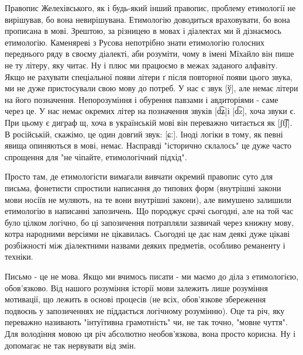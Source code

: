 Правопис Желехівського, як і будь-який інший правопис, проблему етимології не
вирішував, бо вона невирішувана. Етимологію доводиться враховувати, бо вона
прописана в мові. Зрештою, за різницею в мовах і діалектах ми й дізнаємось
етимологію. Каменяреві з Русова непотрібно знати етимологію голосних переднього
ряду в своєму діалекті, аби розуміти, чому в імені Мїхайло він пише не ту
літеру, яку читає. Ну і плюс ми працюємо в межах заданого алфавіту. Якщо не
рахувати спеціальної появи літери ґ після повторної появи цього звука, ми не
дуже пристосували свою мову до потреб. У нас є звук [ў], але немає літери на
його позначення. Непорозуміння і обурення павзами і авдиторіями - саме через
це. У нас немає окремих літер на позначення звуків [d͡ʑ]і [d͡z], хоча звуки є.
При цьому є диграф щ, хоча в українській мові він переважно читається як [ʃt͡ʃ].
В російській, скажімо, це один довгий звук: [ɕː]. Іноді логіки в тому, як певні
явища опиняються в мові, немає. Насправді "історично склалось" це дуже часто
спрощення для "не чіпайте, етимологічний підхід". 

Просто там, де етимологісти вимагали вивчати окремий правопис суто для письма,
фонетисти спростили написання до типових форм (внутрішні закони мови носіїв не
муляють, на те вони внутрішні закони), але вимушено залишили етимологію в
написанні запозичень. Що породжує срачі сьогодні, але на той час було цілком
логічно, бо ці запозичення потрапляли зазвичай через книжну мову, котра
народними версіями не цікавилась. Сьогодні це дає нам деякі дуже цікаві
розбіжності між діалектними назвами деяких предметів, особливо реманенту і
техніки.

Письмо - це не мова. Якщо ми вчимось писати - ми маємо до діла з етимологією,
обов'язково. Від нашого розуміння історії мови залежить лише розуміння
мотивації, що лежить в основі процесів (не всіх, обов'язкове збереження
подвоєнь у запозиченнях не піддається логічному розумінню). Оце та річ, яку
переважно називають "інтуїтивна грамотність" чи, не так точно, "мовне чуття".
Для володіння мовою ця річ абсолютно необов'язкова, вона просто корисна. Ну і
допомагає не так нервувати від змін.
